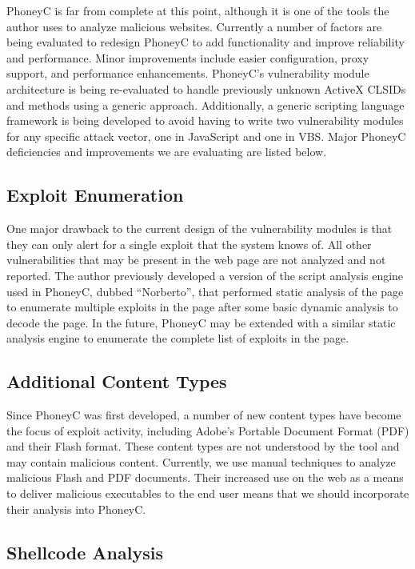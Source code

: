 \documentclass[10pt,twocolumn]{article}
\begin{document}
PhoneyC is far from complete at this point, although it is one of the tools the author uses to analyze malicious websites. Currently a number of factors are being evaluated to redesign PhoneyC to add functionality and improve reliability and performance. Minor improvements include easier configuration, proxy support, and performance enhancements. PhoneyC's vulnerability module architecture is being re-evaluated to handle previously unknown ActiveX CLSIDs and methods using a generic approach. Additionally, a generic scripting language framework is being developed to avoid having to write two vulnerability modules for any specific attack vector, one in JavaScript and one in VBS. Major PhoneyC deficiencies and improvements we are evaluating are listed below.

\subsection{Exploit Enumeration}
\label{exploit-enumeration}

One major drawback to the current design of the vulnerability modules is that they can only alert for a single exploit that the system knows of. All other vulnerabilities that may be present in the web page are not analyzed and not reported. The author previously developed a version of the script analysis engine used in PhoneyC, dubbed ``Norberto'', that performed static analysis of the page to enumerate multiple exploits in the page after some basic dynamic analysis to decode the page. In the future, PhoneyC may be extended with a similar static analysis engine to enumerate the complete list of exploits in the page.

\subsection{Additional Content Types}
\label{add-content}

Since PhoneyC was first developed, a number of new content types have become the focus of exploit activity, including Adobe's Portable Document Format (PDF) and their Flash format. These content types are not understood by the tool and may contain malicious content. Currently, we use manual techniques to analyze malicious Flash and PDF documents. Their increased use on the web as a means to deliver malicious executables to the end user means that we should incorporate their analysis into PhoneyC.

\subsection{Shellcode Analysis}
\label{shellcode}
\end{document}
